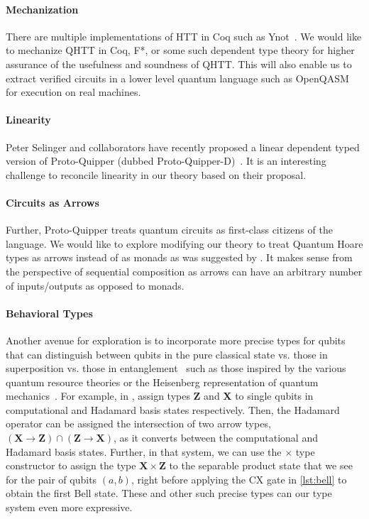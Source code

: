 \documentclass[adraft,creativecommons]{eptcs}
\theoremstyle{definition}
\theoremstyle{remark}
\begin{document}
\paragraph{Mechanization} There are multiple implementations of HTT in Coq such as Ynot~\parencite{ynot2008}. We would like to mechanize QHTT in Coq, F*, or some such dependent type theory for higher assurance of the usefulness and soundness of QHTT. This will also enable us to extract verified circuits in a lower level quantum language such as OpenQASM~\parencite{cross2017} for execution on real machines.

\paragraph{Linearity} Peter Selinger and collaborators have recently proposed a linear dependent typed version of Proto-Quipper (dubbed Proto-Quipper-D)~\parencite{selinger2020,fu2020linear}. It is an interesting challenge to reconcile linearity in our theory based on their proposal.

\paragraph{Circuits as Arrows} Further, Proto-Quipper treats quantum circuits as first-class citizens of the language. We would like to explore modifying our theory to treat Quantum Hoare types as arrows instead of as monads as was suggested by \textcite{so-arrows}. It makes sense from the perspective of sequential composition as arrows can have an arbitrary number of inputs/outputs as opposed to monads.

\paragraph{Behavioral Types} Another avenue for exploration is to incorporate more precise types for qubits that can distinguish between qubits in the pure classical state vs. those in superposition vs. those in entanglement~\parencite{JorrandPerdrix2009} such as those inspired by the various quantum resource theories or the Heisenberg representation of quantum mechanics~\parencite{rssl2019,rssl20}. For example, in , \textcite{rssl20} assign types \textbf{Z} and \textbf{X} to single qubits in computational and Hadamard basis states respectively. Then, the Hadamard operator can be assigned the intersection of two arrow types, $(\mathbf{X} \rightarrow \mathbf{Z}) \cap (\mathbf{Z} \rightarrow \mathbf{X})$, as it converts between the computational and Hadamard basis states. Further, in that system, we can use the $\times$ type constructor to assign the type $\mathbf{X} \times \mathbf{Z}$ to the separable product state that we see for the pair of qubits $(a, b)$, right before applying the CX gate in \cref{lst:bell} to obtain the first Bell state. These and other such precise types can our type system even more expressive.
\end{document}
